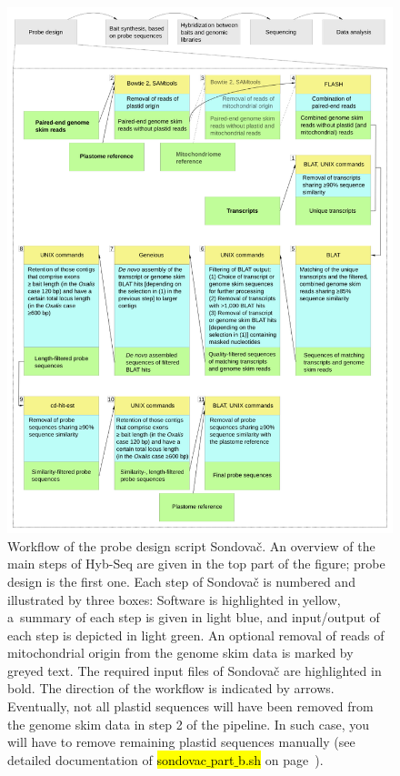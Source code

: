 \documentclass[a4paper, 11pt, twoside]{article}
\renewcommand{\texttt}[1]{\hl{\ttfamily #1}}
\begin{document}
\begin{figure}[p]
\begin{center}
\includegraphics[width=14.5cm]{pipeline_workflow.png}
\end{center}
\caption[Workflow of the probe design script Sondovač]{Workflow of the probe design script Sondovač. An overview of the main steps of Hyb-Seq are given in the top part of the figure; probe design is the first one. Each step of Sondovač is numbered and illustrated by three boxes: Software is highlighted in yellow, a~summary of each step is given in light blue, and input/output of each step is depicted in light green. An optional removal of reads of mitochondrial origin from the genome skim data is marked by greyed text. The required input files of Sondovač are highlighted in bold. The direction of the workflow is indicated by arrows. Eventually, not all plastid sequences will have been removed from the genome skim data in step 2 of the pipeline. In such case, you will have to remove remaining plastid sequences manually (see detailed documentation of \texttt{sondovac$\_$part$\_$b.sh} on page~\pageref{partb}).}
\label{pipeline-workflow}
\end{figure}
\end{document}
